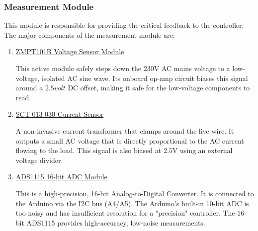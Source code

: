 \documentclass[11pt]{article}
\begin{document}
\subsubsection{Measurement Module}
This module is responsible for providing the critical feedback to the controller. The major components of the measurement module are:
\begin{enumerate}
	\item \underline{ZMPT101B Voltage Sensor Module}

		This active module safely steps down the $230\si{\volt}$ AC mains voltage to a low-voltage, isolated AC sine wave. Its onboard op-amp circuit biases this signal around a $2.5\si{volt}$ DC offset, making it safe for the low-voltage components to read.

	\item \underline{SCT-013-030 Current Sensor}

		A non-invasive current transformer that clamps around the live wire. It outputs a small AC voltage that is directly proportional to the AC current flowing to the load. This signal is also biased at $2.5\si{\volt}$ using an external voltage divider.

	\item \underline{ADS1115 16-bit  ADC Module}

		This is a high-precision, 16-bit Analog-to-Digital Converter. It is connected to the Arduino via the I2C bus (A4/A5). The Arduino's built-in 10-bit ADC is too noisy and has insufficient resolution for a "precision" controller. The 16-bit ADS1115 provides high-accuracy, low-noise measurements.
\end{enumerate}
\end{document}
